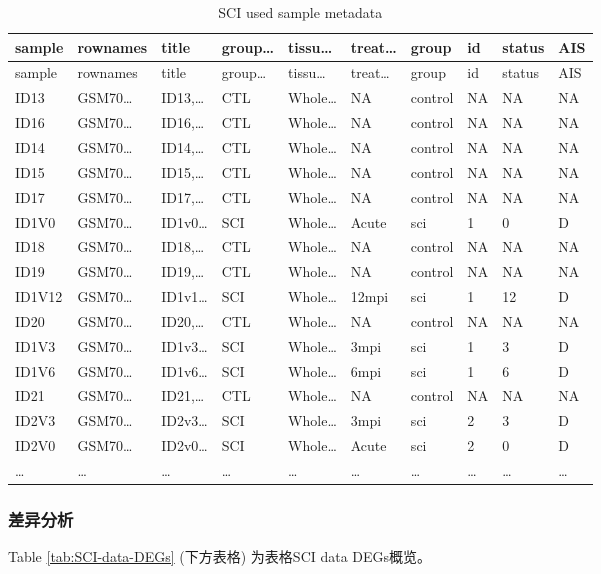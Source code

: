 \documentclass[
]{article}
\begin{document}
\begin{longtable}[]{@{}llllllllll@{}}
\caption{\label{tab:SCI-used-sample-metadata}SCI used sample metadata}\tabularnewline
\toprule
sample & rownames & title & group\ldots{} & tissu\ldots{} & treat\ldots{} & group & id & status & AIS\tabularnewline
\midrule
\endfirsthead
\toprule
sample & rownames & title & group\ldots{} & tissu\ldots{} & treat\ldots{} & group & id & status & AIS\tabularnewline
\midrule
\endhead
ID13 & GSM70\ldots{} & ID13,\ldots{} & CTL & Whole\ldots{} & NA & control & NA & NA & NA\tabularnewline
ID16 & GSM70\ldots{} & ID16,\ldots{} & CTL & Whole\ldots{} & NA & control & NA & NA & NA\tabularnewline
ID14 & GSM70\ldots{} & ID14,\ldots{} & CTL & Whole\ldots{} & NA & control & NA & NA & NA\tabularnewline
ID15 & GSM70\ldots{} & ID15,\ldots{} & CTL & Whole\ldots{} & NA & control & NA & NA & NA\tabularnewline
ID17 & GSM70\ldots{} & ID17,\ldots{} & CTL & Whole\ldots{} & NA & control & NA & NA & NA\tabularnewline
ID1V0 & GSM70\ldots{} & ID1v0\ldots{} & SCI & Whole\ldots{} & Acute & sci & 1 & 0 & D\tabularnewline
ID18 & GSM70\ldots{} & ID18,\ldots{} & CTL & Whole\ldots{} & NA & control & NA & NA & NA\tabularnewline
ID19 & GSM70\ldots{} & ID19,\ldots{} & CTL & Whole\ldots{} & NA & control & NA & NA & NA\tabularnewline
ID1V12 & GSM70\ldots{} & ID1v1\ldots{} & SCI & Whole\ldots{} & 12mpi & sci & 1 & 12 & D\tabularnewline
ID20 & GSM70\ldots{} & ID20,\ldots{} & CTL & Whole\ldots{} & NA & control & NA & NA & NA\tabularnewline
ID1V3 & GSM70\ldots{} & ID1v3\ldots{} & SCI & Whole\ldots{} & 3mpi & sci & 1 & 3 & D\tabularnewline
ID1V6 & GSM70\ldots{} & ID1v6\ldots{} & SCI & Whole\ldots{} & 6mpi & sci & 1 & 6 & D\tabularnewline
ID21 & GSM70\ldots{} & ID21,\ldots{} & CTL & Whole\ldots{} & NA & control & NA & NA & NA\tabularnewline
ID2V3 & GSM70\ldots{} & ID2v3\ldots{} & SCI & Whole\ldots{} & 3mpi & sci & 2 & 3 & D\tabularnewline
ID2V0 & GSM70\ldots{} & ID2v0\ldots{} & SCI & Whole\ldots{} & Acute & sci & 2 & 0 & D\tabularnewline
\ldots{} & \ldots{} & \ldots{} & \ldots{} & \ldots{} & \ldots{} & \ldots{} & \ldots{} & \ldots{} & \ldots{}\tabularnewline
\bottomrule
\end{longtable}

\hypertarget{ux5deeux5f02ux5206ux6790}{%
\subsubsection{差异分析}\label{ux5deeux5f02ux5206ux6790}}

Table \ref{tab:SCI-data-DEGs} (下方表格) 为表格SCI data DEGs概览。
\end{document}
